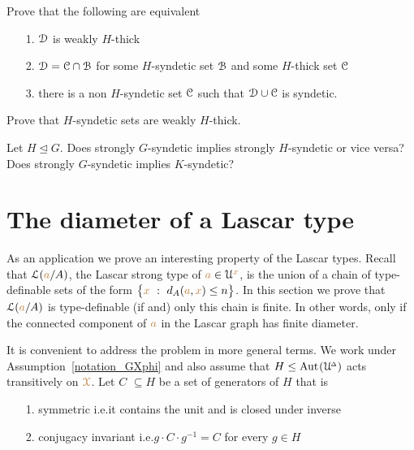 \begin{exercise}
  Prove that the following are equivalent
  \begin{itemize}
    \item[1.] $\EuScript D$ is weakly $H$-thick
    \item[2.] $\EuScript D=\EuScript C\cap\EuScript B$ for some $H$-syndetic set $\EuScript B$ and some $H$-thick set $\EuScript C$
    \item [3.] there is a non $H$-syndetic set $\EuScript C$ such that $\EuScript D\cup\EuScript C$ is syndetic.
  \end{itemize}
\end{exercise}

\begin{exercise}
  Prove that $H$-syndetic sets are weakly $H$-thick.
\end{exercise}

\begin{question}
  Let $H\trianglelefteq G$.
  Does strongly $G$-syndetic implies strongly $H$-syndetic or vice versa?
  Does strongly $G$-syndetic implies $K$-syndetic?
\end{question}

\section{The diameter of a Lascar type}\label{newelski}

As an application we prove an interesting property of the Lascar types.
Recall that $\EuScript L({\color{brown} a}/A)$, the Lascar strong type of ${\color{brown} a}\in\EuScript U^{\color{brown} x}$, is the union of a chain of type-definable sets of the form $\big\{{\color{brown} x}\ :\ d_A({\color{brown} a},{\color{brown} x})\le n\big\}$.
In this section we prove that $\EuScript L({\color{brown} a}/A)$ is type-definable (if and) only this chain is finite.
In other words, only if the connected component of ${\color{brown} a}$ in the Lascar graph has finite diameter.

It is convenient to address the problem in more general terms.
We work under Assumption~\ref{notation_GXphi} and also assume that $H\le{\rm Aut\kern.15ex}(\EuScript U\kern-.2ex^{\scriptscriptstyle\Delta})$ acts transitively on ${\color{brown}\EuScript X}$.
Let \emph{$C$\/} $\subseteq H$ be a set of generators of $H$ that is
\begin{itemize}
  \item[1.] symmetric i.e.\@ it contains the unit and is closed under inverse
  \item[2.] conjugacy invariant i.e.\@ $g{\cdot}C{\cdot}g^{-1}=C$ for every $g\in H$
\end{itemize}

